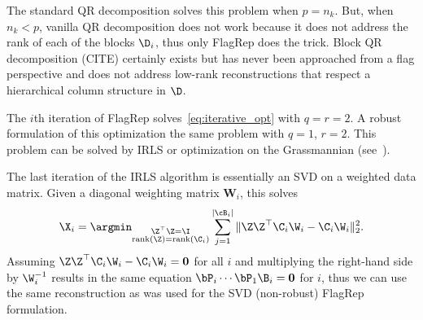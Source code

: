 \begin{remark}[Comparison to QR]
The standard QR decomposition solves this problem when $p = n_k$. But, when $n_k < p$, vanilla QR decomposition does not work because it does not address the rank of each of the blocks $\D_i$, thus only FlagRep does the trick. Block QR decomposition (CITE) certainly exists but has never been approached from a flag perspective and does not address low-rank reconstructions that respect a hierarchical column structure in $\D$. %
\end{remark}


\begin{remark}
    The $i$th iteration of FlagRep solves~\cref{eq:iterative_opt} with $q=r=2$. A robust formulation of this optimization the same problem with $q=1$, $r=2$. This problem can be solved by IRLS or optimization on the Grassmannian (see~\cite{maunu2019well}).

    The last iteration of the IRLS algorithm is essentially an SVD on a weighted data matrix. Given a diagonal weighting matrix $\mathbf{W}_i$, this solves
    \begin{equation}
        \X_{i} = \argmin_{\substack{\Z^\top\Z = \I \\ \text{rank}(\Z) = \text{rank}(\C_i)}} \sum_{j=1}^{|\cB_i|} \|\Z \Z^\top \C_i\W_i - \C_i\W_i \|_2^2.
    \end{equation}
    Assuming $\Z \Z^\top \C_i\W_i - \C_i\W_i  = \mathbf{0}$ for all $i$ and multiplying the right-hand side by $\W_i^{-1}$ results in the same equation $\bP_i \cdots \bP_1 \B_i = \mathbf{0}$ for $i$, thus we can use the same reconstruction as was used for the SVD (non-robust) FlagRep formulation.
\end{remark}




